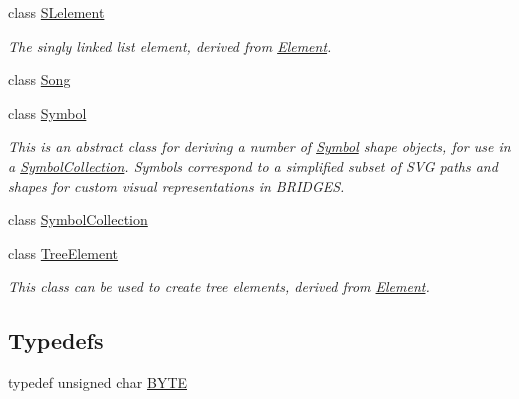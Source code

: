 \begin{DoxyCompactItemize}
class \mbox{\hyperlink{classbridges_1_1_s_lelement}{S\+Lelement}}
\begin{DoxyCompactList}\small\item\em The singly linked list element, derived from \mbox{\hyperlink{classbridges_1_1_element}{Element}}. \end{DoxyCompactList}\item 
class \mbox{\hyperlink{classbridges_1_1_song}{Song}}
\item 
class \mbox{\hyperlink{classbridges_1_1_symbol}{Symbol}}
\begin{DoxyCompactList}\small\item\em This is an abstract class for deriving a number of \mbox{\hyperlink{classbridges_1_1_symbol}{Symbol}} shape objects, for use in a \mbox{\hyperlink{classbridges_1_1_symbol_collection}{Symbol\+Collection}}. Symbols correspond to a simplified subset of S\+VG paths and shapes for custom visual representations in B\+R\+I\+D\+G\+ES. \end{DoxyCompactList}\item 
class \mbox{\hyperlink{classbridges_1_1_symbol_collection}{Symbol\+Collection}}
\item 
class \mbox{\hyperlink{classbridges_1_1_tree_element}{Tree\+Element}}
\begin{DoxyCompactList}\small\item\em This class can be used to create tree elements, derived from \mbox{\hyperlink{classbridges_1_1_element}{Element}}. \end{DoxyCompactList}\end{DoxyCompactItemize}
\subsection*{Typedefs}
\begin{DoxyCompactItemize}
\item 
typedef unsigned char \mbox{\hyperlink{namespacebridges_a59b77ee45243ba85c701fb8ab298ef00}{B\+Y\+TE}}
\end{DoxyCompactItemize}
